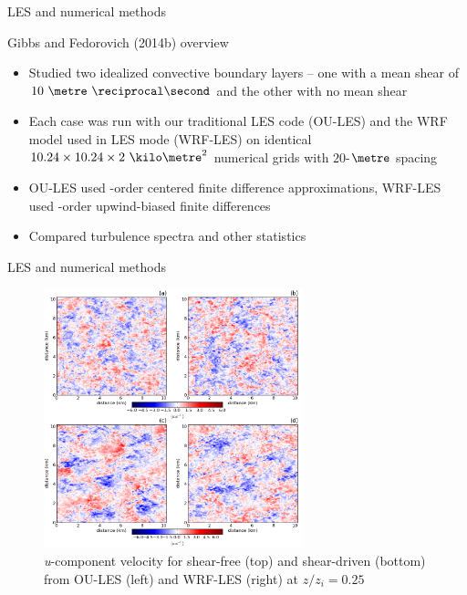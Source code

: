 
\begin{frame}{LES and numerical methods}

Gibbs and Fedorovich (2014b) overview
\begin{itemize}
\item Studied two idealized convective boundary layers -- one with a mean shear of $10\ \metre\ \reciprocal\second$ and the other with no mean shear
\item Each case was run with our traditional LES code (OU-LES) and the WRF model used in LES mode (WRF-LES) on identical $10.24\times 10.24 \times 2\ \kilo\metre^2$ numerical grids with $20$-$\metre$ spacing
\item OU-LES used -order centered finite difference approximations, WRF-LES used -order upwind-biased finite differences
\item Compared turbulence spectra and other statistics
\end{itemize}
\end{frame}


\begin{frame}{LES and numerical methods}

\begin{figure}
	\includegraphics[width=0.67\textwidth]{gibbs1}
	\caption{\scriptsize \textit{u}-component velocity for shear-free (top) and shear-driven (bottom) from OU-LES (left) and WRF-LES (right) at $z/z_i=0.25$}
\end{figure}

\end{frame}


